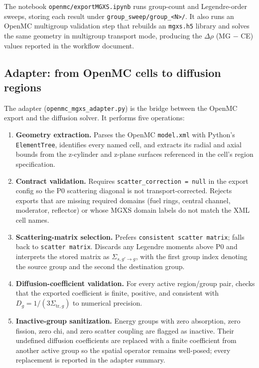 \documentclass[11pt]{article}
\begin{document}
The notebook \texttt{openmc/exportMGXS.ipynb} runs group-count and
Legendre-order sweeps, storing each result under
\texttt{group\_sweep/group\_<N>/}.  It also runs an OpenMC multigroup
validation step that rebuilds an \texttt{mgxs.h5} library and solves the same
geometry in multigroup transport mode, producing the $\Delta\rho$ (MG $-$ CE)
values reported in the workflow document.

\subsection{Adapter: from OpenMC cells to diffusion regions}

The adapter (\texttt{openmc\_mgxs\_adapter.py}) is the bridge between the
OpenMC export and the diffusion solver.  It performs five operations:

\begin{enumerate}
  \item \textbf{Geometry extraction.}  Parses the OpenMC \texttt{model.xml}
        with Python's \texttt{ElementTree}, identifies every named cell, and
        extracts its radial and axial bounds from the z-cylinder and z-plane
        surfaces referenced in the cell's region specification.
  \item \textbf{Contract validation.}  Requires
        \texttt{scatter\_correction = null} in the export config so the P0
        scattering diagonal is not transport-corrected.  Rejects exports that
        are missing required domains (fuel rings, central channel, moderator,
        reflector) or whose MGXS domain labels do not match the XML cell names.
  \item \textbf{Scattering-matrix selection.}  Prefers
        \texttt{consistent scatter matrix}; falls back to \texttt{scatter matrix}.
        Discards any Legendre moments above P0 and interprets the stored matrix
        as $\Sigma_{s,g'\rightarrow g}$, with the first group index denoting the
        source group and the second the destination group.
  \item \textbf{Diffusion-coefficient validation.}  For every active
        region/group pair, checks that the exported coefficient is finite,
        positive, and consistent with
        $D_g=1/(3\Sigma_{\mathrm{tr},g})$ to numerical precision.
  \item \textbf{Inactive-group sanitization.}  Energy groups with zero
        absorption, zero fission, zero chi, and zero scatter coupling are
        flagged as inactive.  Their undefined diffusion coefficients are
        replaced with a finite coefficient from another active group so the
        spatial operator remains well-posed; every replacement is reported in
        the adapter summary.
\end{enumerate}
\end{document}
